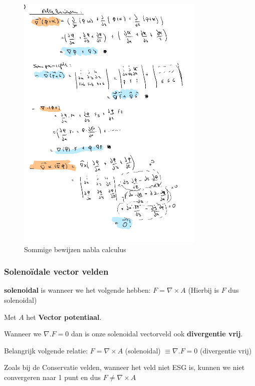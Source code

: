 \documentclass[a4paper]{article}
\begin{document}
\begin{figure}[H]
	\centering
	\includegraphics[width=0.8\textwidth]{assets/sommige_bewijzen_nabla_calculus.png}
	\caption{Sommige bewijzen nabla calculus}
	\label{fig:sommige_bewijzen_nabla_calculus}
\end{figure}

\subsubsection{Solenoïdale vector velden}

\textbf{solenoidal} is wanneer we het volgende hebben: $F = \nabla \times A$ (Hierbij is $F$ dus solenoidal)

Met $A$ het \textbf{Vector potentiaal}.

Wanneer we $\nabla . F = 0$ dan is onze solenoidal vectorveld ook \textbf{divergentie vrij}.

Belangrijk volgende relatie: $F = \nabla \times A$ (solenoidal) $\equiv \nabla . F = 0$ (divergentie vrij)

Zoals bij de Conservatie velden, wanneer het veld niet ESG is, kunnen we niet convergeren naar 1 punt en dus $F \neq \nabla \times A$
\end{document}
